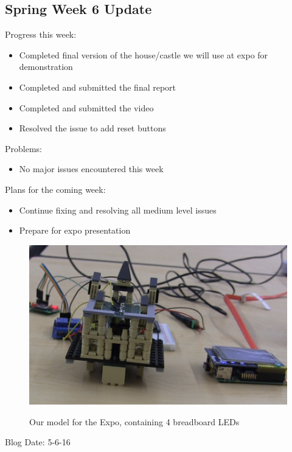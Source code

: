 \subsection{Spring Week 6 Update}
Progress this week:
\begin{itemize}
   \item Completed final version of the house/castle we will use at expo for demonstration
   \item Completed and submitted the final report
   \item Completed and submitted the video
   \item Resolved the issue to add reset buttons
\end{itemize}
Problems:
\begin{itemize}
   \item No major issues encountered this week
\end{itemize}
Plans for the coming week:
\begin{itemize}
   \item Continue fixing and resolving all medium level issues
   \item Prepare for expo presentation
\end{itemize}
\begin{figure}[h!]
   \includegraphics[scale=0.5]{castle}\\
   \caption{Our model for the Expo, containing 4 breadboard LEDs}
\end{figure}
Blog Date: 5-6-16

